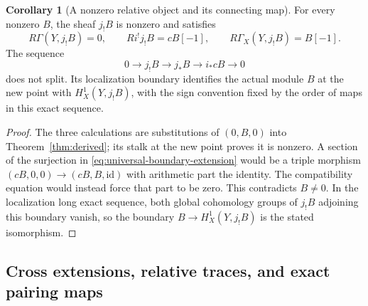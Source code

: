 \documentclass[11pt,a4paper]{article}
\theoremstyle{definition}\newtheorem{definition}[theorem]{Definition}
\newtheorem{corollary}[theorem]{Corollary}
\begin{document}
\begin{corollary}[A nonzero relative object and its connecting map]
\label{cor:boundary}
For every nonzero $B$, the sheaf $j_!B$ is nonzero and satisfies
\[
 R\Gamma(Y,j_!B)=0,\qquad Ri^!j_!B=cB[-1],\qquad
 R\Gamma_X(Y,j_!B)=B[-1].
 \tag{RP10}\label{eq:boundary-object}
\]
The sequence
\[
 0\longrightarrow j_!B\longrightarrow j_*B
 \longrightarrow i_*cB\longrightarrow0
 \tag{RP11}\label{eq:universal-boundary-extension}
\]
does not split. Its localization boundary identifies the actual module
$B$ at the new point with $H^1_X(Y,j_!B)$, with the sign convention
fixed by the order of maps in this exact sequence.
\end{corollary}
\begin{proof}
The three calculations are substitutions of $(0,B,0)$ into
Theorem~\ref{thm:derived}; its stalk at the new point proves it is
nonzero. A section of the surjection in
\eqref{eq:universal-boundary-extension} would be a triple morphism
$(cB,0,0)\to(cB,B,\mathrm{id})$ with arithmetic part the identity.
The compatibility equation would instead force that part to be zero.
This contradicts $B\ne0$. In the localization long exact sequence,
both global cohomology groups of $j_!B$ adjoining this boundary vanish,
so the boundary $B\to H^1_X(Y,j_!B)$ is the stated isomorphism.
\end{proof}

\subsection{Cross extensions, relative traces, and exact pairing maps}
\end{document}

